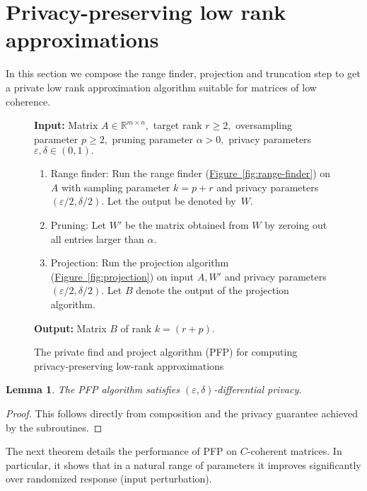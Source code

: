 \documentclass[letterpaper,11pt]{article}
\newtheorem{lemma}[theorem]{Lemma}
\theoremstyle{definition}
\newcommand{\figurelabel}[1]{\label{fig:#1}}
\newcommand{\figureref}[1]{\hyperref[fig:#1]{Figure~\ref{fig:#1}}}
\newcommand{\itemlabel}[1]{\label{item:#1}}
\renewcommand{\ge}{\geqslant}
\renewcommand{\epsilon}{\varepsilon}
\newcommand{\PFP}{\textrm{\small PFP}\xspace}
\begin{document}
\section{Privacy-preserving low rank approximations}

In this section we compose the range finder, projection and truncation step to
get a private low rank approximation algorithm suitable for matrices of low
coherence.

\begin{figure}[ht]
\begin{boxedminipage}{\textwidth}
{\bf Input:} Matrix $A\in\mathbb{R}^{m\times n},$ target rank $r\ge 2,$ oversampling
parameter $p\ge 2,$ pruning parameter $\alpha>0,$
privacy parameters $\epsilon,\delta\in(0,1).$
\begin{enumerate}
\item {\sc Range finder:}
\itemlabel{range-finder}
Run the range finder (\figureref{range-finder})
on $A$ with sampling parameter $k=p+r$ and privacy
parameters $(\epsilon/2,\delta/2).$ Let the output be denoted by~$W.$
\item {\sc Pruning:}
\itemlabel{pruning}
Let $W'$ be the matrix obtained from $W$ by zeroing out all entries larger
than $\alpha.$
\item {\sc Projection:}
\itemlabel{projection}
Run the projection algorithm (\figureref{projection}) on input $A,W'$ and
privacy parameters $(\epsilon/2,\delta/2).$
Let $B$ denote the output of the projection algorithm.
\end{enumerate}
{\bf Output:} Matrix $B$ of rank $k=(r+p).$
\end{boxedminipage}
\caption{The private find and project algorithm (\PFP) for computing
privacy-preserving low-rank approximations}
\figurelabel{find-project}
\end{figure}

\begin{lemma}
The \PFP algorithm satisfies $(\epsilon,\delta)$-differential privacy.
\end{lemma}

\begin{proof}
This follows directly from composition and the privacy guarantee achieved by
the subroutines.
\end{proof}

The next theorem details the performance of \PFP on $C$-coherent matrices. In
particular, it shows that in a natural range of parameters it improves
significantly over randomized response (input perturbation).
\end{document}
